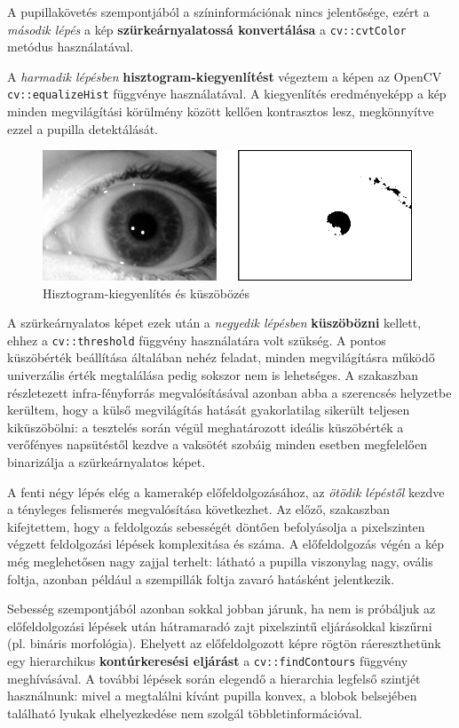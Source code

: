 A pupillakövetés szempontjából a színinformációnak nincs jelentősége, ezért a \emph{második lépés} a kép \textbf{szürkeárnyalatossá konvertálása} a \texttt{cv::cvtColor} metódus használatával.

A \emph{harmadik lépésben} \textbf{hisztogram-kiegyenlítést} végeztem a képen az OpenCV \texttt{cv::equalizeHist} függvénye használatával. A kiegyenlítés eredményeképp a kép minden megvilágítási körülmény között kellően kontrasztos lesz, megkönnyítve ezzel a pupilla detektálását.

\begin{figure}[!ht]
\centering
\includegraphics[width=110mm, keepaspectratio]{figures/eq_thresh.png}
\caption{Hisztogram-kiegyenlítés és küszöbözés}
\label{fig:eq_thresh}
\end{figure}

A szürkeárnyalatos képet ezek után a \emph{negyedik lépésben} \textbf{küszöbözni} kellett, ehhez a \texttt{cv::threshold} függvény használatára volt szükség. A pontos küszöbérték beállítása általában nehéz feladat, minden megvilágításra működő univerzális érték megtalálása pedig sokszor nem is lehetséges. A  szakaszban részletezett infra-fényforrás megvalósításával azonban abba a szerencsés helyzetbe kerültem, hogy a külső megvilágítás hatását gyakorlatilag sikerült teljesen kiküszöbölni: a tesztelés során végül meghatározott ideális küszöbérték a verőfényes napsütéstől kezdve a vaksötét szobáig minden esetben megfelelően binarizálja a szürkeárnyalatos képet.

\bigskip

A fenti négy lépés elég a kamerakép előfeldolgozásához, az \emph{ötödik lépéstől} kezdve a tényleges felismerés megvalósítása következhet. Az előző,  szakaszban kifejtettem, hogy a feldolgozás sebességét döntően befolyásolja a pixelszinten végzett feldolgozási lépések komplexitása és száma. A előfeldolgozás végén a kép még meglehetősen nagy zajjal terhelt: látható a pupilla viszonylag nagy, ovális foltja, azonban például a szempillák foltja zavaró hatásként jelentkezik.

Sebesség szempontjából azonban sokkal jobban járunk, ha nem is próbáljuk az előfeldolgozási lépések után hátramaradó zajt pixelszintű eljárásokkal kiszűrni (pl. bináris morfológia). Ehelyett az előfeldolgozott képre rögtön ráereszthetünk egy hierarchikus \textbf{kontúrkeresési eljárást} a \texttt{cv::findContours} függvény meghívásával. A további lépések során elegendő a hierarchia legfelső szintjét használnunk: mivel a megtalálni kívánt pupilla konvex, a blobok belsejében található lyukak elhelyezkedése nem szolgál többletinformációval.

